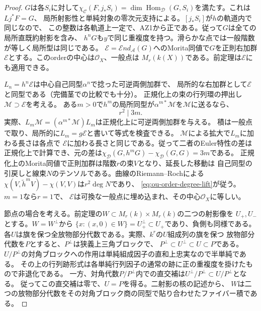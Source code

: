 \documentclass[11pt,a4paper]{ltjsarticle}
\theoremstyle{definition}
\begin{document}
\begin{proof}
$G$は各$S_i$に対して$\chi_{\mathcal C}(F,j_*S_i)
=\dim\operatorname{Hom}_{\mathcal D}(G,S_i)$を満たす。これは$Lj^*F=G$、
局所射影性と単純対象の零次元支持による。$[j_*S_i]$が$h$の軌道内で同じなので、
この整数は各軌道上一定で、AZ1から正である。従って$G$は全ての局所直既約射影を含み、
$h^nG$も$y$で同じ重複度を持つ。滑らかな点では一般階数が等しく局所型は同じである。
$\mathcal E=\mathcal End_{\mathcal A}(G)$へのMorita同値で$G$を正則右加群
$\mathcal E$とする。このorderの中心は$\mathcal O_X$、一般点は
$M_r(k(X))$である。前定理は$\mathcal E$にも適用できる。

$L_n=h^n\mathcal E$は中心自己同型$\alpha^n$で捻った可逆両側加群で、
局所的な右加群として$\mathcal E$と同型である（完備茎での比較でも十分）。
正規化上の束の行列環の押出し$\mathcal M\supset\mathcal E$を考える。
ある$m>0$で$h^m$の局所同型が$\alpha^{m*}\mathcal M$を$\mathcal M$に送るなら、
\[
                         r^2\mid 3m. \tag{**}\label{eq:ou-order-degree-lift}
\]
実際、$L_m\mathcal M=(\alpha^{m*}\mathcal M)L_m$は正規化上に可逆両側加群を与える。
積は一般点で取り、局所的に$L_m=g\mathcal E$と書いて等式を検査できる。
$\mathcal M$による拡大で$L_m$に加わる長さは各点で
$\mathcal E$に加わる長さと同じである。従って二者のEuler特性の差は
正規化上で計算でき、元の差は$\chi_{\mathcal D}(G,h^mG)-\chi_{\mathcal D}(G,G)=3m$である。
正規化上のMorita同値で正則加群は階数$r$の束$V$となり、延長した移動は
自己同型の引戻しと線束$N$のテンソルである。曲線のRiemann--Rochによる
$\chi(V,\widetilde h^m V)-\chi(V,V)$は$r^2\deg N$であり、
\eqref{eq:ou-order-degree-lift}が従う。$m=1$なら$r=1$で、
$\mathcal E$は可換な一般点に埋め込まれ、その中心$\mathcal O_X$に等しい。

節点の場合を考える。前定理の$W\subset M_r(k)\times M_r(k)$の二つの射影像を
$U_+,U_-$とする。$W=W^\perp$から
$\{x:(x,0)\in W\}=U_+^\perp\subset U_+$であり、負側も同様である。
各$U$は旗を保つ全放物部分代数である。実際、$k^r$の$U$組成列の旗を保つ
放物部分代数を$P$とすると、$P^\perp$は狭義上三角ブロックで、
$P^\perp\subset U^\perp\subset U\subset P$である。
$U/P^\perp$の対角ブロックへの作用は単純組成因子の直和上忠実なので半単純である。
その上の行列跡形式は各単純行列因子の通常の跡に正の重複度を掛けたもので非退化である。
一方、対角代数$P/P^\perp$内での直交補は$U^\perp/P^\perp\subset U/P^\perp$となる。
従ってこの直交補は零で、$U=P$を得る。二射影の核の記述から、
$W$は二つの放物部分代数をその対角ブロック商の同型で貼り合わせたファイバー積である。


\end{proof}
\end{document}
